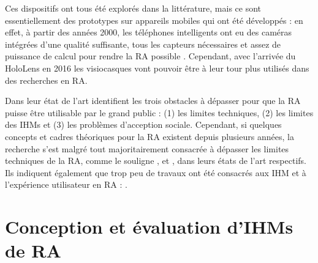 



Ces dispositifs ont tous été explorés dans la littérature, mais ce sont essentiellement des prototypes sur appareils mobiles qui ont été développés : en effet, à partir des années 2000, les téléphones intelligents ont eu des caméras intégrées d'une qualité suffisante, tous les capteurs nécessaires et assez de puissance de calcul pour rendre la RA possible \citep{Huang2013}. Cependant, avec l'arrivée du HoloLens en 2016 les visiocasques vont pouvoir être à leur tour plus utilisés dans des recherches en RA.

Dans leur état de l'art \cite{Azuma2001} identifient les trois obstacles à dépasser pour que la RA puisse être utilisable par le grand public : (1) les limites techniques, (2) les limites des IHMs et (3) les problèmes d'acception sociale. Cependant, si quelques concepts et cadres théoriques pour la RA existent depuis plusieurs années, la recherche s'est malgré tout majoritairement consacrée à dépasser les limites techniques de la RA, comme le souligne \cite{Zhou2008}, \cite{VanKrevelen2010} et \cite{Billinghurst2015}, dans leurs états de l'art respectifs. Ils indiquent également que trop peu de travaux ont été consacrés aux IHM et à l'expérience utilisateur en RA :  \citep{Billinghurst2015}.


\section{Conception et évaluation d'IHMs de RA}
\label{sec:litterature_ar_hci}

